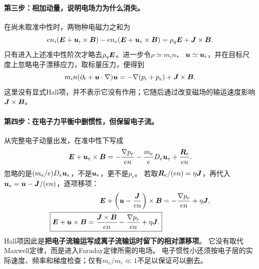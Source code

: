 \documentclass[UTF8,a4paper,11pt,openany,fontset=fandol]{ctexbook}
\begin{document}
\paragraph{第三步：相加动量，说明电场力为什么消失。}
在尚未取准中性时，两物种电磁力之和为
\begin{equation}
 en_i(\bm{E}+\bm{u}_i\times\bm{B})-en_e(\bm{E}+\bm{u}_e\times\bm{B})
 =\rho_q\bm{E}+\bm{J}\times\bm{B}.
\end{equation}
只有进入上述准中性阶次才略去$\rho_q\bm{E}$。进一步令$\rho\simeq m_in$、
$\bm{u}\simeq\bm{u}_i$，并在目标尺度上忽略电子漂移应力，取标量压力，便得到
\begin{equation}
 m_in(\partial_t+\bm{u}\cdot\nabla)\bm{u}
 =-\nabla(p_i+p_e)+\bm{J}\times\bm{B}.
\end{equation}
这里没有显式Hall项，并不表示它没有作用；它随后通过改变磁场的输运速度影响$\bm{J}\times\bm{B}$。

\paragraph{第四步：在电子力平衡中删惯性，但保留电子流。}
从完整电子动量出发，在准中性下写成
\begin{equation}
 \bm{E}+\bm{u}_e\times\bm{B}
 =-\frac{\nabla p_e}{en}-\frac{m_e}{e}D_e\bm{u}_e+\frac{\bm{R}_e}{en}.
\end{equation}
忽略的是$(m_e/e)D_e\bm{u}_e$，不是$\bm{u}_e$，更不是$p_e$。
若取$\bm{R}_e/(en)=\eta\bm{J}$，再代入$\bm{u}_e=\bm{u}-\bm{J}/(en)$，逐项移项：
\begin{align}
 \bm{E}+\left(\bm{u}-\frac{\bm{J}}{en}\right)\times\bm{B}
 &=-\frac{\nabla p_e}{en}+\eta\bm{J},\\
 \boxed{\bm{E}+\bm{u}\times\bm{B}
 =\frac{\bm{J}\times\bm{B}}{en}-\frac{\nabla p_e}{en}+\eta\bm{J}.}
 \label{eq:tutorial-hall-origin}
\end{align}
Hall项因此是\textbf{把电子流输运写成离子流输运时留下的相对漂移项}。
它没有取代Maxwell定律，而是进入Faraday定律所需的电场。
电子惯性小还须按电子层的实际速度、频率和梯度检查；仅有$m_e/m_i\ll1$不足以保证可以删去。
\end{document}
